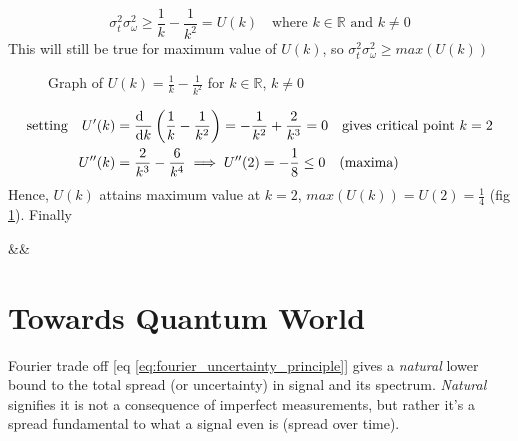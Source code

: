 \documentclass[11pt, a4paper]{article}
\let\oldsection\section
\renewcommand{\section}{%
	\setcounter{equation}{0}%
	\oldsection%
}
\newcommand{\quotedsingle}[1]{#1}	%
\newcommand{\quotedsingleit}[1]{\quotedsingle{\textit{#1}}}	%
\newcommand{\eqrefnp}[1]{\textup{\ref{#1}}}  %
\newcommand{\primed}[1]{#1^{\prime}}
\newcommand{\variance}[1]{\sigma_{#1}^{2}}
\newcommand{\stdev}[1]{\sigma_{#1}}
\newcommand{\diff}{\mathop{}\!\mathrm{d}}
\newcommand{\derv}[1]{\frac{\diff \hfill}{\diff #1}}	%
\newcommand{\dervb}[2]{\derv{#1} \left(#2\right)}  %
\begin{document}
	\begin{equation}
		\boxed{\variance{t} \variance{\omega} \geq \frac{1}{k} - \frac{1}{k^{2}} = U(k)} \quad \text{where } k \in \mathbb{R} \text{ and } k \neq 0
	\end{equation}
	This will still be true for maximum value of $U(k)$, so $\variance{t} \variance{\omega} \geq max(U(k))$
	\begin{figure}
		\centering
		\caption{Graph of $U(k) = \frac{1}{k} - \frac{1}{k^{2}}$ for $k \in \mathbb{R}$, $k \neq 0$}
		\label{fig:fourier_uncertainty_function}
	\end{figure}
	\begin{align*}
		\text{setting} \quad \primed{U}(k) & = \dervb{k}{\frac{1}{k} - \frac{1}{k^{2}}} = -\frac{1}{k^{2}} + \frac{2}{k^{3}} = 0 \quad \text{gives critical point } k = 2 \\
		U^{\prime \prime}(k) & = \frac{2}{k^{3}} - \frac{6}{k^{4}} \implies U^{\prime \prime}(2) = -\frac{1}{8} \leq 0 \quad \text{(maxima)}
	\end{align*}
	Hence, $U(k)$ attains maximum value at $k=2$, $max(U(k)) = U(2) = \frac{1}{4}$ (fig \ref{fig:fourier_uncertainty_function}). Finally
	\begin{flalign}\label{eq:fourier_uncertainty_principle}
		 \quad \boxed{\variance{t} \variance{\omega} \geq \frac{1}{4} \quad \text{or} \quad \stdev{t} \stdev{\omega} \geq \frac{1}{2}}&&
	\end{flalign}
	
	\section{Towards Quantum World}
	Fourier trade off [eq \eqrefnp{eq:fourier_uncertainty_principle}] gives a \textit{natural} lower bound to the total spread (or uncertainty) in signal and its spectrum. \quotedsingleit{Natural} signifies it is not a consequence of imperfect measurements, but rather it's a spread fundamental to what a signal even is (spread over time). 
	
\end{document}
